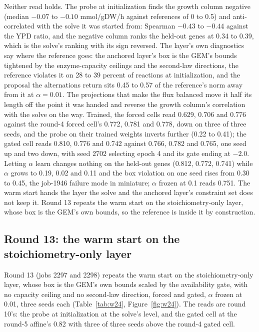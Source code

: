 Neither read holds. The probe at initialization finds the growth column negative (median
$-0.07$ to $-0.10$ mmol/gDW/h against references of 0 to 0.5) and anti-correlated with
the solve it was started from: Spearman $-0.43$ to $-0.44$ against the YPD ratio, and the
negative column ranks the held-out genes at 0.34 to 0.39, which is the solve's ranking
with its sign reversed. The layer's own diagnostics say where the reference goes: the
anchored layer's box is the GEM's bounds tightened by the enzyme-capacity ceilings and the
second-law directions, the reference violates it on 28 to 39 percent of reactions at
initialization, and the proposal the alternations return sits 0.45 to 0.57 of the
reference's norm away from it at $\alpha = 0.01$. The projections that make the flux
balanced move it half its length off the point it was handed and reverse the growth
column's correlation with the solve on the way. Trained, the forced cells read 0.629,
0.706 and 0.776 against the round-4 forced cell's 0.772, 0.781 and 0.778, down on three of
three seeds, and the probe on their trained weights inverts further (0.22 to 0.41); the
gated cell reads 0.810, 0.776 and 0.742 against 0.766, 0.782 and 0.765, one seed up and
two down, with seed 2702 selecting epoch 4 and its gate ending at $-2.0$. Letting $\alpha$
learn changes nothing on the held-out genes (0.812, 0.772, 0.741) while $\alpha$ grows to
0.19, 0.02 and 0.11 and the box violation on one seed rises from 0.30 to 0.45, the job-1946
failure mode in miniature; $\alpha$ frozen at 0.1 reads 0.751. The warm start hands the
layer the solve and the anchored layer's constraint set does not keep it. Round 13 repeats
the warm start on the stoichiometry-only layer, whose box is the GEM's own bounds, so the
reference is inside it by construction.

\subsection{Round 13: the warm start on the stoichiometry-only layer}

Round 13 (jobs 2297 and 2298) repeats the warm start on the stoichiometry-only layer,
whose box is the GEM's own bounds scaled by the availability gate, with no capacity
ceiling and no second-law direction, forced and gated, $\alpha$ frozen at 0.01, three
seeds each (Table~\ref{tab:w24}, Figure~\ref{fig:w24}). The reads are round 10's: the
probe at initialization at the solve's level, and the gated cell at the round-5
affine's 0.82 with three of three seeds above the round-4 gated cell.

